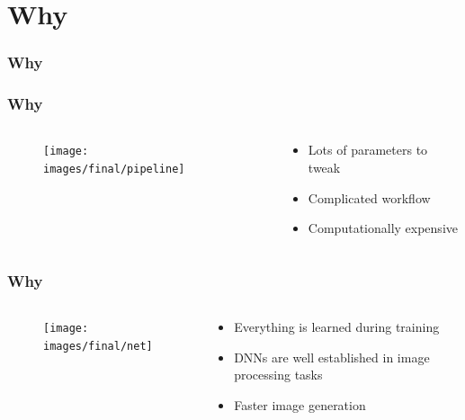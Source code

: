 \documentclass[18pt, xcolor=table]{beamer}
\begin{document}
\section{Why}

\begin{frame}[t]
  \frametitle{Why}
\end{frame}

\begin{frame}
  \frametitle{Why}
  \begin{columns}[t]
    \begin{column}{0.5\textwidth}
      \vspace{-0.5cm}
      \begin{center}
        \begin{figure}[htb]
          \texttt{[image: images/final/pipeline]}
        \end{figure}
      \end{center}
    \end{column}
    \begin{column}{0.5\textwidth}
      \begin{itemize}
      \item Lots of parameters to tweak
      \item Complicated workflow
      \item Computationally expensive
      \end{itemize}
    \end{column}
  \end{columns}
\end{frame}

\begin{frame}
  \frametitle{Why}
  \begin{columns}[t]
    \begin{column}{0.5\textwidth}
      \vspace{-0.5cm}
      \begin{center}
        \begin{figure}[htb]
          \texttt{[image: images/final/net]}
        \end{figure}
      \end{center}
    \end{column}
    \begin{column}{0.5\textwidth}
      \begin{itemize}
      \item Everything is learned during training
      \item DNNs are well established in image processing tasks
      \item Faster image generation
      \end{itemize}
    \end{column}
  \end{columns}
\end{frame}
\end{document}

